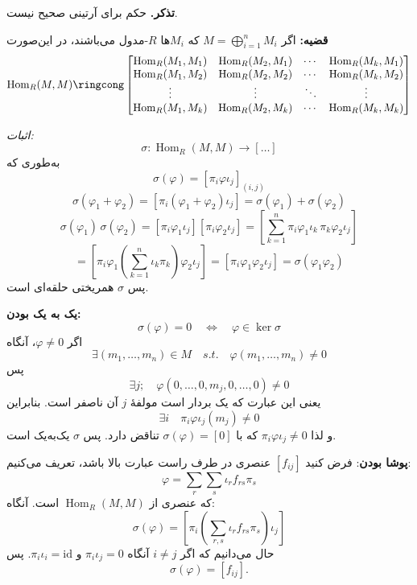 \textbf{تذکر.} حکم برای آرتینی صحیح نیست.

\textbf{قضیه:} اگر $M = \bigoplus_{i=1}^n M_i$ که $M_i$ها $R$-مدول می‌باشند، در این‌صورت
\[
    \operatorname{Hom}_R(M,M) \ringcong
    \begin{bmatrix}
        \operatorname{Hom}_R(M_1,M_1) & \operatorname{Hom}_R(M_2,M_1) & \cdots & \operatorname{Hom}_R(M_k,M_1) \\
        \operatorname{Hom}_R(M_1,M_2) & \operatorname{Hom}_R(M_2,M_2) & \cdots & \operatorname{Hom}_R(M_k,M_2) \\
        \vdots                        & \vdots                        & \ddots & \vdots                        \\
        \operatorname{Hom}_R(M_1,M_k) & \operatorname{Hom}_R(M_2,M_k) & \cdots & \operatorname{Hom}_R(M_k,M_k)
    \end{bmatrix}
\]

\textit{اثبات:}
\[
    \sigma : \operatorname{Hom}_R(M,M) \longrightarrow \left[ \dots \right]
\]
به‌طوری که
\[
    \sigma(\varphi) = \left[ \pi_i \varphi \iota_j \right]_{(i,j)}
\]
\[
    \sigma(\varphi_1 + \varphi_2) = \left[ \pi_i (\varphi_1 + \varphi_2) \iota_j \right]
    = \sigma(\varphi_1) + \sigma(\varphi_2)
\]
\[
    \sigma(\varphi_1) \, \sigma(\varphi_2) =
    \left[ \pi_i \varphi_1 \iota_j \right] \left[ \pi_i \varphi_2 \iota_j \right]
    = \left[ \sum_{k=1}^n \pi_i \varphi_1 \iota_k \, \pi_k \varphi_2 \iota_j \right]
\]
\[
    = \left[ \pi_i \varphi_1 \left( \sum_{k=1}^n \iota_k \pi_k \right) \varphi_2 \iota_j \right]
    = \left[ \pi_i \varphi_1 \varphi_2 \iota_j \right]
    = \sigma(\varphi_1 \varphi_2)
\]
پس $\sigma$ همریختی حلقه‌ای است.

\textbf{یک به یک بودن:}
\[
    \sigma(\varphi) = 0 \quad \Longleftrightarrow \quad \varphi \in \ker\sigma
\]
اگر $\varphi \neq 0$، آنگاه
\[
    \exists (m_1,\dots,m_n) \in M \quad s.t. \quad \varphi(m_1,\dots,m_n) \neq 0
\]
پس
\[
    \exists j; \quad \varphi(0,\dots,0,m_j,0,\dots,0) \neq 0
\]
یعنی این عبارت که یک بردار است مولفهٔ $j$ آن ناصفر است. بنابراین
\[
    \exists i \quad \pi_i \varphi \iota_j(m_j) \neq 0
\]
و لذا $\pi_i \varphi \iota_j \neq 0$ که با $\sigma(\varphi) = [0]$ تناقض دارد. پس $\sigma$ یک‌به‌یک است.

\textbf{پوشا بودن}: فرض کنید $\left[ f_{ij} \right]$ عنصری در طرف راست عبارت بالا باشد، تعریف می‌کنیم:
\[
    \varphi = \sum_{r} \sum_{s} \iota_r f_{rs} \pi_s
\]
که عنصری از $\operatorname{Hom}_R(M,M)$ است. آنگاه:
\[
    \sigma(\varphi) =
    \left[ \pi_i \left( \sum_{r,s} \iota_r f_{rs} \pi_s \right) \iota_j \right]
\]
حال می‌دانیم که اگر $i \neq j$ آنگاه $\pi_i \iota_j = 0$ و $\pi_i \iota_i = \mathrm{id}$.
پس
\[
    \sigma(\varphi) = \left[ f_{ij} \right].
\]

